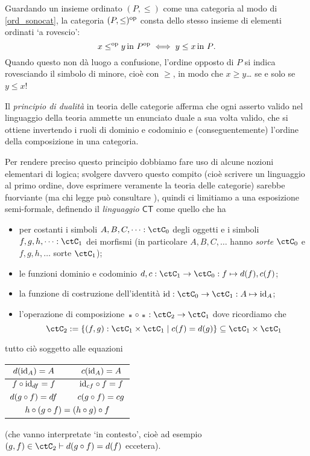 \begin{example}
	Guardando un insieme ordinato \((P,\le)\) come una categoria al modo di \ref{ord_sonocat}, la categoria \((P,\le)^{\text{op}}\) consta dello stesso insieme di elementi ordinati `a rovescio':
	\[x\le^{\text{op}} y \, \text{in \(P^{\text{op}}\)}\iff y\le x\, \text{in \(P\)}.\]
	Quando questo non dà luogo a confusione, l'ordine opposto di \(P\) si indica rovesciando il simbolo di minore, cioè con \(\ge\), in modo che \(x\ge y\)\dots{} se e solo se \(y\le x\)!
\end{example}
\begin{proposition}
	Il \emph{principio di dualità} in teoria delle categorie afferma che ogni asserto valido nel linguaggio della teoria ammette un enunciato duale a sua volta valido, che si ottiene invertendo i ruoli di dominio e codominio e (conseguentemente) l'ordine della composizione in una categoria.

	Per rendere preciso questo principio dobbiamo fare uso di alcune nozioni elementari di logica; svolgere davvero questo compito (cioè scrivere un linguaggio al primo ordine, dove esprimere veramente la teoria delle categorie) sarebbe fuorviante (ma chi legge può consultare \cite{ETCC}), quindi ci limitiamo a una esposizione semi-formale, definendo il \emph{linguaggio \(\mathsf{CT}\)} come quello che ha
	\begin{itemize}
		\item per costanti i simboli \(A,B,C,\dots : \ctC_0\) degli oggetti e i simboli \(f,g,h,\dots : \ctC_1\) dei morfismi (in particolare \(A,B,C,\dots\) hanno \emph{sorte} \(\ctC_0\) e \(f,g,h,\dots\) sorte \(\ctC_1\));
		\item le funzioni dominio e codominio \(d,c : \ctC_1\to\ctC_0:f\mapsto d(f),c(f)\);
		\item la funzione di costruzione dell'identità \(\id : \ctC_0\to \ctC_1 : A\mapsto \Id[A]\);
		\item l'operazione di composizione \(\blank\cmp\blank : \ctC_2 \to \ctC_1\) dove ricordiamo che
		      \[\ctC_2 := \{(f,g) : \ctC_1\times\ctC_1\mid c(f) = d(g)\}\subseteq\ctC_1\times\ctC_1\]
	\end{itemize}
	tutto ciò soggetto alle equazioni
	\begin{center}
		\begin{tabular}{ccc}
			\(d(\Id[A])=A\)     &  & \(c(\Id[A])=A\)     \\\midrule
			\(f\cmp \Id[df]=f\) &  & \(\Id[cf]\cmp f=f\) \\\midrule
			\(d(g\circ f)=df\)   &  & \(c(g\circ f)=cg\)   \\\midrule
			\multicolumn{3}{c}{\(h\circ (g\circ f)=(h\circ g)\circ f\)}
		\end{tabular}
	\end{center}
	(che vanno interpretate `in contesto', cioè ad esempio \((g,f) \in \ctC_2\vdash d(g\cmp f)=d(f)\) eccetera).


\end{proposition}
